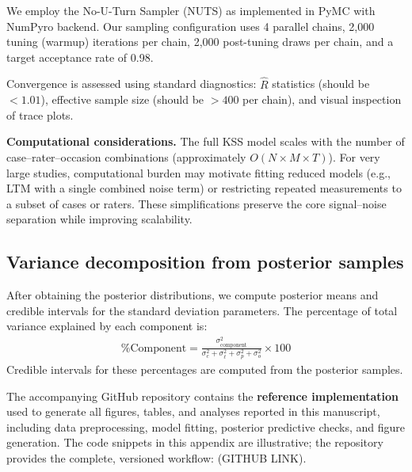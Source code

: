 We employ the No-U-Turn Sampler (NUTS) as implemented in PyMC with NumPyro backend. Our sampling configuration uses 4 parallel chains, 2,000 tuning (warmup) iterations per chain, 2,000 post-tuning draws per chain, and a target acceptance rate of 0.98.

Convergence is assessed using standard diagnostics: $\hat{R}$ statistics (should be $<1.01$), effective sample size (should be $>400$ per chain), and visual inspection of trace plots.

\textbf{Computational considerations.} The full KSS model scales with the number of case--rater--occasion combinations (approximately $O(N \times M \times T)$). For very large studies, computational burden may motivate fitting reduced models (e.g., LTM with a single combined noise term) or restricting repeated measurements to a subset of cases or raters. These simplifications preserve the core signal--noise separation while improving scalability.

\subsection*{Variance decomposition from posterior samples}
After obtaining the posterior distributions, we compute posterior means and credible intervals for the standard deviation parameters. The percentage of total variance explained by each component is:
\begin{eqnarray*}
\text{\% Component} = \frac{\sigma^2_{\text{component}}}{\sigma^2_c + \sigma^2_\ell + \sigma^2_p + \sigma^2_o} \times 100
\end{eqnarray*}
Credible intervals for these percentages are computed from the posterior samples.

The accompanying GitHub repository contains the \textbf{reference implementation} used to generate all figures, tables, and analyses reported in this manuscript, including data preprocessing, model fitting, posterior predictive checks, and figure generation. The code snippets in this appendix are illustrative; the repository provides the complete, versioned workflow: (GITHUB LINK).

